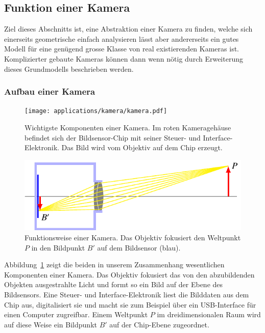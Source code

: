 %
%
%
\subsection{Funktion einer Kamera\label{subsection:kamerafunktion}}
Ziel dieses Abschnitts ist, eine Abstraktion einer Kamera zu finden,
welche sich einerseits geometrische einfach analysieren lässt aber
andererseits ein gutes Modell für eine genügend grosse Klasse von
real existierenden Kameras ist.
Komplizierter gebaute Kameras können dann wenn nötig durch Erweiterung dieses
Grundmodells beschrieben werden.
\subsubsection{Aufbau einer Kamera}
\begin{figure}
\centering
\texttt{[image: applications/kamera/kamera.pdf]}
\caption{Wichtigste Komponenten einer Kamera. Im roten Kameragehäuse befindet
sich der Bildsensor-Chip mit seiner Steuer- und Interface-Elektronik.
Das Bild wird vom Objektiv auf dem Chip erzeugt.
\label{applications:kamera:kamera-bild}}
\end{figure}
\begin{figure}
\centering
\includegraphics{applications/kamera/kameraprinzip.pdf}
\caption{Funktionsweise einer Kamera. Das Objektiv fokusiert den
Weltpunkt $P$ in den Bildpunkt $B'$ auf dem Bildsensor ({\color{blue}blau}).
\label{applications:kamera:kameraprinzip}}
\end{figure}
Abbildung~\ref{applications:kamera:kamera-bild} zeigt die beiden in unserem
Zusammenhang wesentlichen Komponenten einer Kamera.
Das Objektiv fokusiert das von den abzubildenden Objekten ausgestrahlte
Licht und formt so ein Bild auf der Ebene des Bildsensors.
Eine Steuer- und Interface-Elektronik liest die Bilddaten aus dem Chip
aus, digitalisiert sie und macht sie zum Beispiel über ein USB-Interface
für einen Computer zugreifbar.
Einem Weltpunkt $P$ im dreidimensionalen Raum wird auf diese Weise ein
Bildpunkt $B'$ auf der Chip-Ebene zugeordnet.

